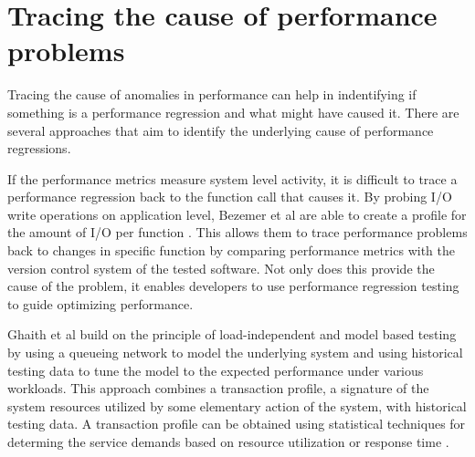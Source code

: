 \section{Tracing the cause of performance problems}
Tracing the cause of anomalies in performance can help in indentifying if something is a performance regression and what might have caused it. There are several approaches that aim to identify the underlying cause of performance regressions.

If the performance metrics measure system level activity, it is difficult to trace a performance regression back to the function call that causes it. By probing I/O write operations on application level, Bezemer et al are able to create a profile for the amount of I/O per function \cite{bezemer2014detecting}. This allows them to trace performance problems back to changes in specific function by comparing performance metrics with the version control system of the tested software. Not only does this provide the cause of the problem, it enables developers to use performance regression testing to guide optimizing performance.

Ghaith et al build on the principle of load-independent and model based testing by using a queueing network to model the underlying system and using historical testing data to tune the model to the expected performance under various workloads. \cite{ghaith2013profile} This approach combines a transaction profile, a signature of the system resources utilized by some elementary action of the system, with historical testing data. A transaction profile can be obtained using statistical techniques for determing the service demands based on resource utilization \cite{casale2008robust} or response time \cite{kraft2009estimating}.
